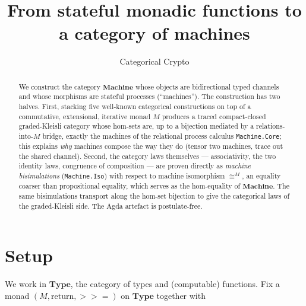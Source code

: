 \documentclass[11pt]{article}
\title{From stateful monadic functions to a category of machines}
\author{Categorical Crypto}
\date{}
\newcommand{\bind}{\mathbin{>\!\!\!>\!\!=}}
\newcommand{\ret}{\mathrm{return}}
\newcommand{\Machine}{\mathbf{Machine}}
\begin{document}
\maketitle

\begin{abstract}
We construct the category $\Machine$ whose objects are bidirectional
typed channels and whose morphisms are stateful processes
(``machines'').  The construction has two halves.  First, stacking
five well-known categorical constructions on top of a commutative,
extensional, iterative monad $M$ produces a traced compact-closed
graded-Kleisli category whose hom-sets are, up to a bijection
mediated by a relations-into-$M$ bridge, exactly the machines of the
relational process calculus \texttt{Machine.Core}; this explains
\emph{why} machines compose the way they do (tensor two machines,
trace out the shared channel).  Second, the category laws themselves
--- associativity, the two identity laws, congruence of composition
--- are proven directly as \emph{machine bisimulations}
(\texttt{Machine.Iso}) with respect to machine isomorphism
$\cong^{M}$, an equality coarser than propositional equality, which
serves as the hom-equality of $\Machine$.  The same bisimulations
transport along the hom-set bijection to give the categorical laws of
the graded-Kleisli side.  The Agda artefact is postulate-free.
\end{abstract}

\section{Setup}
\label{sec:setup}

We work in $\mathbf{Type}$, the category of types and (computable)
functions. Fix a monad $(M, \ret, \bind)$ on $\mathbf{Type}$ together
with
\end{document}
